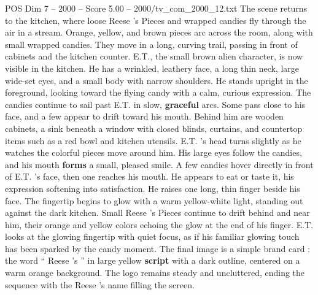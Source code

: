 \begin{textsample}{POS Dim 7 – 2000 – Score 5.00 – 2000/tv\_com\_2000\_12.txt}
The scene returns to the kitchen, where loose Reese ’s Pieces and wrapped candies fly through the air in a stream.
Orange, yellow, and brown pieces arc across the room, along with small wrapped candies.
They move in a long, curving trail, passing in front of cabinets and the kitchen counter.
E.T., the small brown alien character, is now visible in the kitchen.
He has a wrinkled, leathery face, a long thin neck, large wide-set eyes, and a small body with narrow shoulders.
He stands upright in the foreground, looking toward the flying candy with a calm, curious expression.
The candies continue to sail past E.T. in slow, \textbf{graceful} arcs.
Some pass close to his face, and a few appear to drift toward his mouth.
Behind him are wooden cabinets, a sink beneath a window with closed blinds, curtains, and countertop items such as a red bowl and kitchen utensils.
E.T. ’s head turns slightly as he watches the colorful pieces move around him.
His large eyes follow the candies, and his mouth \textbf{forms} a small, pleased smile.
A few candies hover directly in front of E.T. ’s face, then one reaches his mouth.
He appears to eat or taste it, his expression softening into satisfaction.
He raises one long, thin finger beside his face.
The fingertip begins to glow with a warm yellow-white light, standing out against the dark kitchen.
Small Reese ’s Pieces continue to drift behind and near him, their orange and yellow colors echoing the glow at the end of his finger.
E.T. looks at the glowing fingertip with quiet focus, as if his familiar glowing touch has been sparked by the candy moment.
The final image is a simple brand card : the word “ Reese ’s ” in large yellow \textbf{script} with a dark outline, centered on a warm orange background.
The logo remains steady and uncluttered, ending the sequence with the Reese ’s name filling the screen.

\end{textsample}
